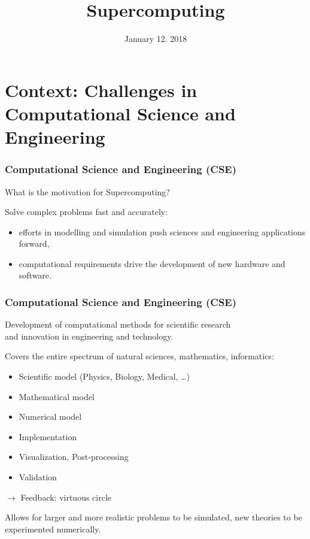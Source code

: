 

\title{Supercomputing}
\date{January 12. 2018}
\maketitle

\section{Context: Challenges in Computational Science and Engineering}

\begin{frame}
  \frametitle{Computational Science and Engineering (CSE)}

\begin{center}
What is the motivation for Supercomputing?
\end{center}

\vspace{2ex}

Solve complex problems fast and accurately:
\begin{itemize}
\item efforts in modelling and simulation push sciences and engineering applications forward,
\item computational requirements drive the development of new hardware and software.
\end{itemize}

\end{frame}

\begin{frame}
  \frametitle{Computational Science and Engineering (CSE)}

\begin{center}
Development of computational methods for scientific research\\ and innovation in engineering and technology.
\end{center}

Covers the entire spectrum of natural sciences, mathematics, informatics:
\begin{itemize}
\item Scientific model (Physics, Biology, Medical, \dots)
\item Mathematical model
\item Numerical model
\item Implementation
\item Visualization, Post-processing
\item Validation
\end{itemize}
$\rightarrow$ Feedback: virtuous circle

\begin{center}
Allows for larger and more realistic problems to be simulated, new theories to be experimented numerically.
\end{center}

\end{frame}

